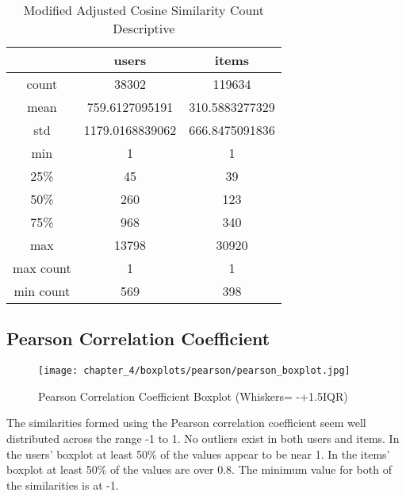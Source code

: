 \begin{table}[H]
\centering
\caption{Modified Adjusted Cosine Similarity Count Descriptive}
\label{table:modified_adjusted_cosine_similarity_count_descriptive}
\begin{tabular}{|c|c|c|}
\hline
          & \textbf{users}  & \textbf{items} \\ \hline
count     & 38302           & 119634         \\ \hline
mean      & 759.6127095191  & 310.5883277329 \\ \hline
std       & 1179.0168839062 & 666.8475091836 \\ \hline
min       & 1               & 1              \\ \hline
25\%      & 45              & 39             \\ \hline
50\%      & 260             & 123            \\ \hline
75\%      & 968             & 340            \\ \hline
max       & 13798           & 30920          \\ \hline
max count & 1               & 1              \\ \hline
min count & 569             & 398            \\ \hline
\end{tabular}
\end{table}

\subsection{Pearson Correlation Coefficient}

\begin{figure}[H]
\centering
\texttt{[image: chapter\_4/boxplots/pearson/pearson\_boxplot.jpg]}
\caption{Pearson Correlation Coefficient Boxplot (Whiskers= -+1.5IQR)}
\label{figure:pearson_corr_coef_boxplot}
\end{figure}

The similarities formed using the Pearson correlation coefficient seem well distributed across
the range -1 to 1. No outliers exist in both users and items. In the users' boxplot at least 50\% of the
values appear to be near 1. In the items' boxplot at least 50\% of the values are over 0.8. The
minimum value for both of the similarities is at -1.


